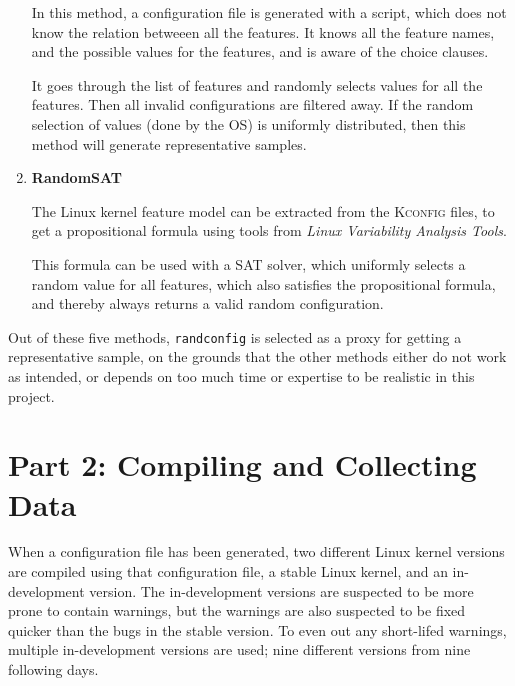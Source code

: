 \documentclass[a4paper,11pt]{report}
\begin{document}
\begin{enumerate}
            \def \fn {It also is aware about \texttt{choice} clauses}

In this method, a configuration file is generated with a script, which 
does not know the relation betweeen all the features. It knows all the feature
names, and the possible values for the features, and is aware of the choice 
clauses.

It goes through the list of features and randomly selects values for all the features. Then 
all invalid configurations are filtered away. If the random selection of values (done by the OS) is uniformly 
distributed, then this method will generate representative samples.


    \item \textbf{RandomSAT}

The Linux kernel feature model can be extracted from the \textsc{Kconfig} 
files, to get a propositional formula using tools from \emph{Linux Variability Analysis Tools}\cite{lvat}. 

This formula can be used with a SAT solver, which uniformly selects a random
value for all features, which also satisfies the propositional formula, and
thereby always returns a valid random configuration.


    
\end{enumerate}


Out of these five methods, \texttt{randconfig} is selected as a proxy for 
getting a representative sample, on the grounds that the other methods either
do not work as intended, or depends on too much time or expertise to be realistic 
in this project.

            \section{Part 2: Compiling and Collecting Data}

When a configuration file has been generated, two different Linux kernel 
versions are compiled using that configuration file, a stable Linux kernel, and 
an in-development version. The in-development versions are suspected to be more 
prone to contain warnings, but the warnings are also suspected to be fixed 
quicker than the bugs in the stable version. To even out any short-lifed 
warnings, multiple in-development versions are used; nine different versions 
from nine following days.
\\
\end{document}

